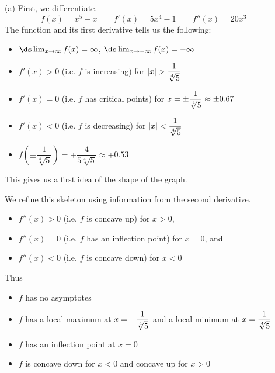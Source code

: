 \begin{solution}
(a)
First, we differentiate.
\[
f(x) = x^5-x\qquad
f'(x)=5x^4-1\qquad
f''(x)=20x^3\qquad
\]
The function and its first derivative tells us the following:
\begin{itemize}
\item $\ds\lim_{x \to \infty} f(x)=\infty$, $\ds\lim_{x \to -\infty} f(x)=-\infty$
\item $f'(x)> 0$ (i.e. $f$ is increasing) for
   $|x|> \dfrac{1}{\root{4}\of{5}}$
\item $f'(x)=0$ (i.e. $f$ has critical points) for $x= \pm\dfrac{1}{\root{4}\of{5}} \approx \pm 0.67$
\item $f'(x)< 0$ (i.e. $f$ is decreasing) for $|x| < \dfrac{1}{\root{4}\of{5}}$
\item $f\left(\pm\dfrac{1}{\sqrt[4]{5}}\right)=\mp\dfrac{4}{5\sqrt[4]{5}}\approx\mp0.53$
\end{itemize}
This gives us a first idea of the shape of the graph.
\begin{center}\end{center}
We refine this skeleton using information from the second derivative.
\begin{itemize}
\item $f''(x)> 0$ (i.e. $f$ is concave up) for $x> 0$,
\item{}$f''(x)=0$ (i.e. $f$ has an inflection point) for $x=0$, and
\item{}$f''(x)< 0$ (i.e. $f$ is concave down) for $x<0$
\end{itemize}
Thus
\begin{itemize}
\item $f$ has no asymptotes
\item $f$ has a local maximum at $x=-\dfrac{1}{\root{4}\of{5}}$
           and  a local minimum at $x=\dfrac{1}{\root{4}\of{5}}$
\item $f$ has an inflection point at $x=0$
\item $f$ is concave down for $x<0$ and concave up for $x>0$
\end{itemize}


\end{solution}
